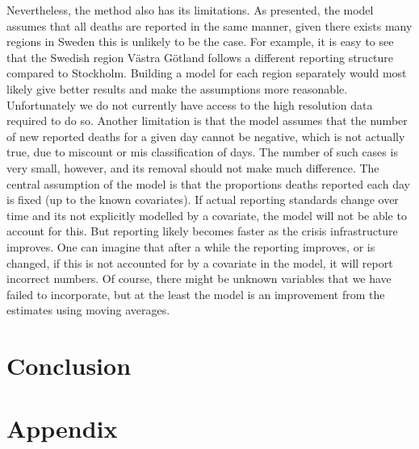 \documentclass[a4paper,11pt,article,oneside,openany,american]{memoir}
\begin{document}
Nevertheless, the method also has its limitations. As presented, the model assumes that all deaths are reported in the same manner, given there exists many regions in Sweden this is unlikely to be the case. For example, it is easy to see that the Swedish region Västra Götland follows a different reporting structure compared to Stockholm. Building a model for each region separately would most likely give better results and make the assumptions more reasonable. Unfortunately we do not currently have access to the high resolution data required to do so. Another limitation is that the model assumes that the number of new reported deaths for a given day cannot be negative, which is not actually true, due to miscount or mis classification of days. The number of such cases is very small, however, and its removal should not make much difference. The central assumption of the model is that the proportions deaths reported each day is fixed (up to the known covariates). If actual reporting standards change over time and its not explicitly modelled by a covariate, the model will not be able to account for this. But reporting likely becomes faster as the crisis infrastructure improves. One can imagine that after a while the reporting improves, or is changed, if this is not accounted for by a covariate in the model, it will report incorrect numbers. Of course, there might be unknown variables that we have failed to incorporate, but at the least the model is an improvement from the estimates using moving averages.

\chapter{Conclusion}

\printbibliography%
\backmatter%
\appendix%
\chapter{Appendix}
%
\end{document}
